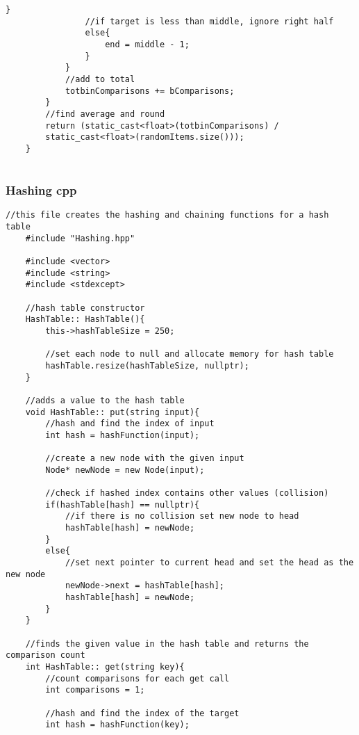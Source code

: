 \documentclass[letterpaper, 10pt,DIV=13]{scrartcl}
\numberwithin{equation}{section} %
\numberwithin{figure}{section} %
\numberwithin{table}{section} %
\begin{document}
\begin{lstlisting}[frame=single, ]
                }
                //if target is less than middle, ignore right half
                else{
                    end = middle - 1;
                }
            }
            //add to total
            totbinComparisons += bComparisons;
        }
        //find average and round
        return (static_cast<float>(totbinComparisons) / 
        static_cast<float>(randomItems.size()));
    }
    
\end{lstlisting}

\subsubsection*{Hashing cpp}
    \lstset{numbers=left, numberstyle=\tiny, stepnumber=1, numbersep=5pt, basicstyle=\footnotesize\ttfamily}
    \begin{lstlisting}[frame=single, ]
    //this file creates the hashing and chaining functions for a hash table
    #include "Hashing.hpp"
    
    #include <vector>
    #include <string>
    #include <stdexcept>
    
    //hash table constructor
    HashTable:: HashTable(){
        this->hashTableSize = 250;
    
        //set each node to null and allocate memory for hash table
        hashTable.resize(hashTableSize, nullptr);
    }
    
    //adds a value to the hash table
    void HashTable:: put(string input){
        //hash and find the index of input
        int hash = hashFunction(input);
    
        //create a new node with the given input
        Node* newNode = new Node(input);
    
        //check if hashed index contains other values (collision)
        if(hashTable[hash] == nullptr){ 
            //if there is no collision set new node to head
            hashTable[hash] = newNode;
        }
        else{ 
            //set next pointer to current head and set the head as the new node
            newNode->next = hashTable[hash];
            hashTable[hash] = newNode;
        }
    }
    
    //finds the given value in the hash table and returns the comparison count
    int HashTable:: get(string key){
        //count comparisons for each get call
        int comparisons = 1;
    
        //hash and find the index of the target
        int hash = hashFunction(key);
    

\end{lstlisting}
\end{document}
